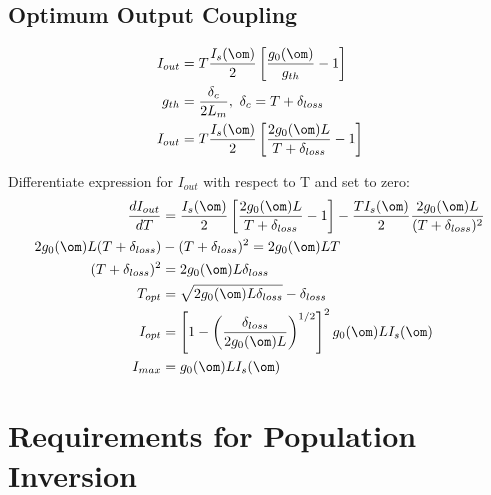 \documentclass[a4paper, 11pt, normalem]{report}
\begin{document}
\section{Optimum Output Coupling}
\begin{multicols}{2}
\begin{figure}[H]
    \centering
\end{figure}
\begin{align}
    I_{out} &= T\frac{I_s(\om)}{2}\left[\frac{g_0(\om)}{g_{th}}-1\right] \\
    g_{th} &= \frac{\delta_c}{2L_m},~ \delta_c = T+\delta_{loss} \\
    I_{out} &= T\frac{I_s(\om)}{2}\left[\frac{2g_0(\om)L}{T+\delta_{loss}}-1\right]
\end{align}
\end{multicols}
Differentiate expression for $I_{out}$ with respect to T and set to zero:
\begin{align}
    \frac{dI_{out}}{dT} &= \frac{I_s(\om)}{2}\left[\frac{2g_0(\om)L}{T+\delta_{loss}}-1\right] - \frac{TI_s(\om)}{2}\frac{2g_0(\om)L}{(T+\delta_{loss})^2} \\
    2g_0(\om)L(T+\delta_{loss}) &- (T+\delta_{loss})^2 = 2g_0(\om)LT \\
    (T+\delta_{loss})^2 &= 2g_0(\om)L\delta_{loss} \\
    T_{opt} &= \sqrt{2g_0(\om)L\delta_{loss}} - \delta_{loss} \\
    I_{opt} &= \left[1-\left(\frac{\delta_{loss}}{2g_0(\om)L}\right)^{1/2}\right]^2 g_0(\om)LI_s(\om) \\
    I_{max} &= g_0(\om)LI_s(\om)
\end{align}

\chapter{Requirements for Population Inversion}
\end{document}
